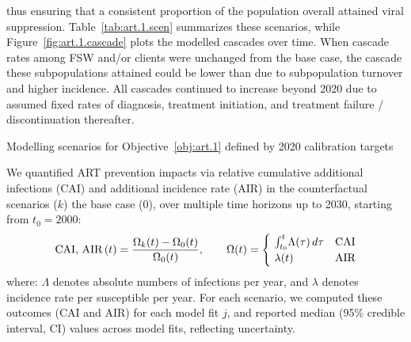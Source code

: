thus ensuring that a consistent proportion of the population overall
attained viral suppression.
Table~\ref{tab:art.1.scen} summarizes these scenarios, while
Figure~\ref{fig:art.1.cascade} plots the modelled cascades over time.
When cascade rates among FSW and/or clients were unchanged from the base case,
the cascade these subpopulations attained could be lower than \cashi
due to subpopulation turnover and higher incidence.
All cascades continued to increase beyond 2020 due to assumed fixed rates of
diagnosis, treatment initiation, and treatment failure / discontinuation thereafter.
\begin{table}
  \centering
  \caption{Modelling scenarios for Objective~\ref{obj:art.1} defined by 2020 calibration targets}
  \label{tab:art.1.scen}
  
\end{table}
\par
We quantified ART prevention impacts via relative
cumulative additional infections (CAI) and additional incidence rate (AIR)
in the counterfactual scenarios ($k$) \vs the base case ($0$),
over multiple time horizons up to 2030, starting from $t_0 = 2000$:
\begin{equation}
  \textnormal{CAI, AIR}\,(t) = \frac{\Omega_{k}(t) - \Omega_{0}(t)}{\Omega_{0}(t)}
  ,\qquad \Omega(t) =
  \begin{cases}
    ~\int_{t_0}^{t}\!\Lambda(\tau)\,d\tau & \textnormal{CAI} \\
    ~\lambda(t) & \textnormal{AIR}
  \end{cases}
\end{equation} where:
$\Lambda$ denotes absolute numbers of infections per year, and
$\lambda$ denotes incidence rate per susceptible per year.
For each scenario, we computed these outcomes (CAI and AIR) for each model fit $j$,
and reported median (95\% credible interval, CI) values across model fits, reflecting uncertainty.
